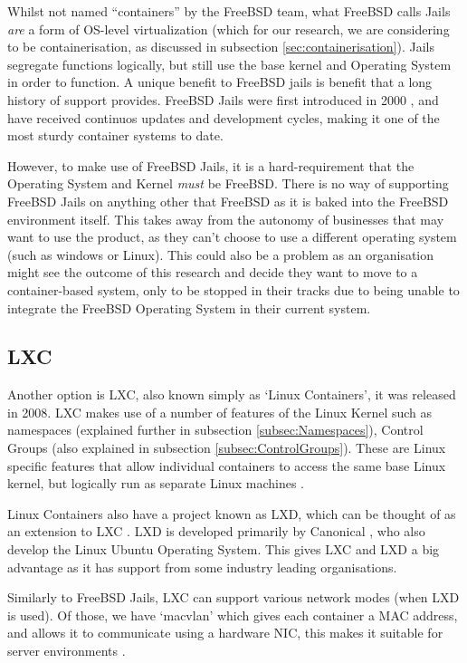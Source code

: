 Whilst not named ``containers'' by the FreeBSD team, what FreeBSD calls Jails \emph{are} a form of OS-level virtualization (which for our research, we are considering to be containerisation, as discussed in subsection \ref{sec:containerisation}). Jails segregate functions logically, but still use the base kernel and Operating System in order to function. A unique benefit to FreeBSD jails is benefit that a long history of support provides. FreeBSD Jails were first introduced in 2000 \citep{FreeBSDJailRelease}, and have received continuos updates and development cycles, making it one of the most sturdy container systems to date.

However, to make use of FreeBSD Jails, it is a hard-requirement that the Operating System and Kernel \emph{must} be FreeBSD. There is no way of supporting FreeBSD Jails on anything other that FreeBSD as it is baked into the FreeBSD environment itself. This takes away from the autonomy of businesses that may want to use the product, as they can't choose to use a different operating system (such as windows or Linux). This could also be a problem as an organisation might see the outcome of this research and decide they want to move to a container-based system, only to be stopped in their tracks due to being unable to integrate the FreeBSD Operating System in their current system.

\subsection{LXC}
Another option is LXC, also known simply as `Linux Containers', it was released in 2008. LXC makes use of a number of features of the Linux Kernel such as namespaces (explained further in subsection \ref{subsec:Namespaces}), Control Groups (also explained in subsection \ref{subsec:ControlGroups}). These are Linux specific features that allow individual containers to access the same base Linux kernel, but logically run as separate Linux machines \citep{LXCIntro}.

Linux Containers also have a project known as LXD, which can be thought of as an extension to LXC \citep{LXCLXD}. LXD is developed primarily by Canonical \citep{LXDIntro}, who also develop the Linux Ubuntu Operating System. This gives LXC and LXD a big advantage as it has support from some industry leading organisations.

Similarly to FreeBSD Jails, LXC can support various network modes (when LXD is used). Of those, we have `macvlan' which gives each container a MAC address, and allows it to communicate using a hardware NIC, this makes it suitable for server environments \citep{LXDNetworks}.

